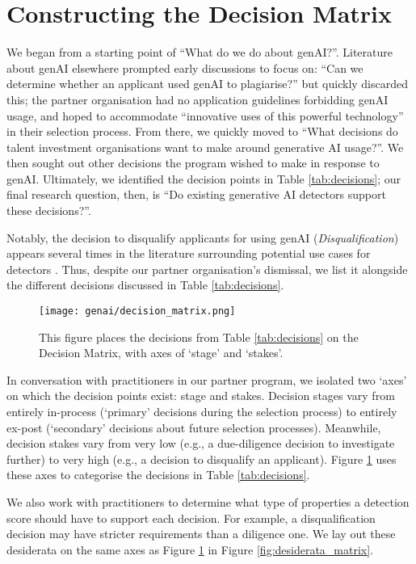 \section{Constructing the Decision Matrix}\label{ssec:poi}
We began from a starting point of ``What do we do about genAI?''. Literature about genAI elsewhere prompted early discussions to focus on: ``Can we determine whether an applicant used genAI to plagiarise?'' but quickly discarded this; the partner organisation had no application guidelines forbidding genAI usage, and hoped to accommodate ``innovative uses of this powerful technology'' in their selection process. From there, we quickly moved to ``What decisions do talent investment organisations want to make around generative AI usage?''. We then sought out other decisions the program wished to make in response to genAI. Ultimately, we identified the decision points in Table \ref{tab:decisions}; our final research question, then, is ``Do existing generative AI detectors support these decisions?''.

Notably, the decision to disqualify applicants for using genAI (\emph{Disqualification}) appears several times in the literature surrounding potential use cases for detectors \cite{gptzero_gptzero_2023,kalpesh_krishna_paraphrasing_2023}. Thus, despite our partner organisation's dismissal, we list it alongside the different decisions discussed in Table \ref{tab:decisions}.

\begin{figure}[htbp]
  \centering
  \texttt{[image: genai/decision\_matrix.png]}
  \caption{This figure places the decisions from Table \ref{tab:decisions} on the Decision Matrix, with axes of `stage' and `stakes'.}
  \label{fig:decision_matrix}
\end{figure}

In conversation with practitioners in our partner program, we isolated two `axes' on which the decision points exist: stage and stakes. Decision stages vary from entirely in-process (`primary' decisions during the selection process) to entirely ex-post (`secondary' decisions about future selection processes). Meanwhile, decision stakes vary from very low (e.g., a due-diligence decision to investigate further) to very high (e.g., a decision to disqualify an applicant). Figure \ref{fig:decision_matrix} uses these axes to categorise the decisions in Table \ref{tab:decisions}.

We also work with practitioners to determine what type of properties a detection score should have to support each decision. For example, a disqualification decision may have stricter requirements than a diligence one. We lay out these desiderata on the same axes as Figure \ref{fig:decision_matrix} in Figure \ref{fig:desiderata_matrix}. 

